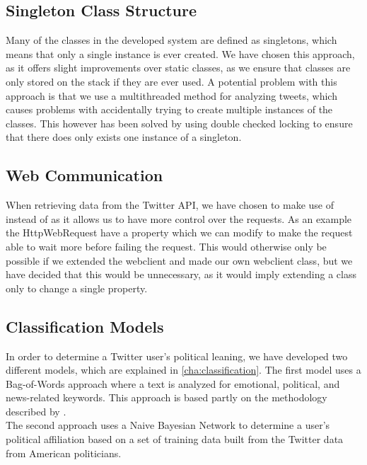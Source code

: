 \subsection{Singleton Class Structure}
Many of the classes in the developed system are defined as singletons, which
means that only a single instance is ever created. We have chosen this approach,
as it offers slight improvements over static classes, as we ensure that classes
are only stored on the stack if they are ever used. A potential problem with
this approach is that we use a multithreaded method for analyzing tweets, which
causes problems with accidentally trying to create multiple instances of the
classes. This however has been solved by using double checked locking to ensure
that there does only exists one instance of a singleton.

\subsection{Web Communication}
When retrieving data from the Twitter API, we have chosen to make use of
 instead of  as it allows us to have
more control over the requests. As an example the HttpWebRequest have a
 property which we can modify to make the request able to wait
more before failing the request. This would otherwise only be possible if we
extended the webclient and made our own webclient class, but we have decided
that this would be unnecessary, as it would imply extending a class only to
change a single property.

\subsection{Classification Models}
In order to determine a Twitter user's political leaning, we have developed two
different models, which are explained in \autoref{cha:classification}. The first
model uses a Bag-of-Words approach where a text is analyzed for
emotional, political, and news-related keywords. This approach is based partly
on the methodology described by \citep{sarlan2014twitter}.\\
The second approach uses a Naive Bayesian Network to determine a user's
political affiliation based on a set of training data built from the Twitter
data from American politicians.

\subsection{}
























